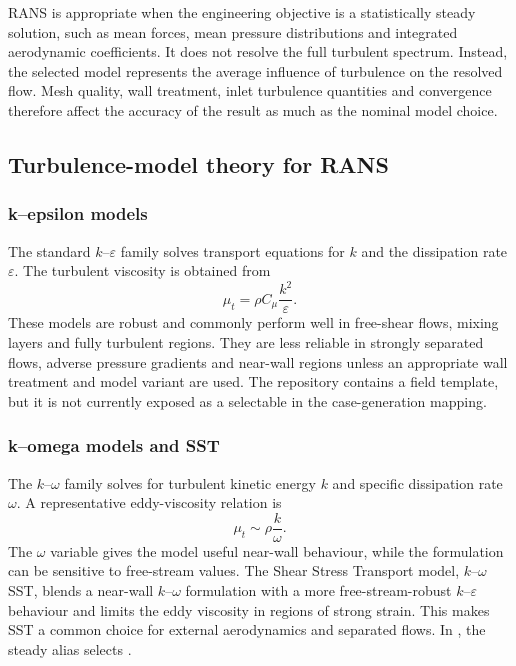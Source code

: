 RANS is appropriate when the engineering objective is a statistically steady solution, such as mean forces, mean pressure distributions and integrated aerodynamic coefficients. It does not resolve the full turbulent spectrum. Instead, the selected model represents the average influence of turbulence on the resolved flow. Mesh quality, wall treatment, inlet turbulence quantities and convergence therefore affect the accuracy of the result as much as the nominal model choice.

\subsection{Turbulence-model theory for RANS}

\subsubsection{k--epsilon models}

The standard $k$--$\varepsilon$ family solves transport equations for $k$ and the dissipation rate $\varepsilon$. The turbulent viscosity is obtained from
\begin{equation}
    \mu_t = \rho C_\mu \frac{k^2}{\varepsilon}.
\end{equation}
These models are robust and commonly perform well in free-shear flows, mixing layers and fully turbulent regions. They are less reliable in strongly separated flows, adverse pressure gradients and near-wall regions unless an appropriate wall treatment and model variant are used. The repository contains a  field template, but it is not currently exposed as a selectable  in the case-generation mapping.

\subsubsection{k--omega models and SST}

The $k$--$\omega$ family solves for turbulent kinetic energy $k$ and specific dissipation rate $\omega$. A representative eddy-viscosity relation is
\begin{equation}
    \mu_t \sim \rho\frac{k}{\omega}.
\end{equation}
The $\omega$ variable gives the model useful near-wall behaviour, while the formulation can be sensitive to free-stream values. The Shear Stress Transport model, $k$--$\omega$ SST, blends a near-wall $k$--$\omega$ formulation with a more free-stream-robust $k$--$\varepsilon$ behaviour and limits the eddy viscosity in regions of strong strain. This makes SST a common choice for external aerodynamics and separated flows. In , the steady alias  selects .


